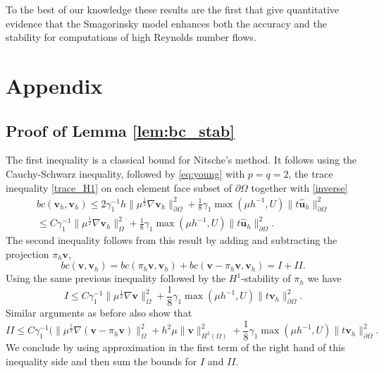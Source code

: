 \documentclass[10pt]{amsart}
\numberwithin{equation}{section}
\theoremstyle{definition}
\theoremstyle{remark}
\renewcommand{\(}{\bigl(}
\renewcommand{\)}{\bigr)}
\newcommand{\bld}[1]{\boldsymbol{#1}}
\newcommand{\bv}{\bld{v}}
\newcommand{\bhu}{\hat{\bld{u}}}
\begin{document}
To the best of our knowledge
these results are the first that give quantitative evidence that the
Smagorinsky model enhances both the accuracy and the stability for computations of high Reynolds number flows.
 
\section*{Appendix}
\subsection*{Proof of Lemma \ref{lem:bc_stab}}
The first inequality is a classical bound for Nitsche's method. It
follows using the Cauchy-Schwarz inequality, followed by
\eqref{eq:young} with $p=q=2$, the trace
inequality \eqref{trace_H1} on each element face subset of $\partial
\Omega$ together with \eqref{inverse}
\begin{multline*}
bc(\bv_h, \bv_h) \leq 2 \gamma_1^{-1} h \|\mu^{\frac12} \nabla
\bv_h \|^2_{\partial \Omega}  + \frac18 \gamma_1 \max(\mu h^{-1},U)
\|t \bhu_h\|^2_{\partial \Omega} \\
\leq  C  \gamma_1^{-1} \|\mu^{\frac12} \nabla
\bv_h\|^2_{\Omega}+ \frac18 \gamma_1 \max(\mu h^{-1},U) \|t \bhu_h\|^2_{\partial
  \Omega}.
\end{multline*}
The second inequality follows from this result by adding and
subtracting the projection $\pi_h \bv$,
\begin{equation*}
bc(\bv, \bv_h)  = bc(\pi_h \bv, \bv_h) + bc(\bv - \pi_h \bv, \bv_h)= I
+ II.
\end{equation*}
Using the same previous inequality followed by the $H^1$-stability of $\pi_h$ we have
\[
I \leq C  \gamma_1^{-1} \|\mu^{\frac12} \nabla\bv\|^2_{\Omega}+ \frac18 \gamma_1 \max(\mu h^{-1},U) \|t \bv_h\|^2_{\partial
  \Omega}.
\]
Similar arguments as before also show that
\[
II \leq C  \gamma_1^{-1} (\|\mu^{\frac12} \nabla
(\bv - \pi_h \bv)\|^2_{\Omega} + h^2 \mu \|\bv\|_{H^2(\Omega)}^2+ \frac18 \gamma_1 \max(\mu h^{-1},U) \|t \bv_h\|^2_{\partial
  \Omega}.
\]
We conclude by using approximation in the first term of the right hand
of this inequality
side and then sum the bounds for $I$ and $II$.
\end{document}
